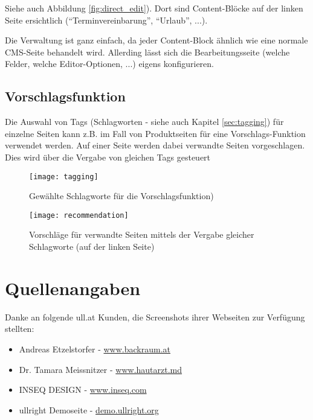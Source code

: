 \documentclass[article, a4paper, oneside, 11pt]{memoir}
\begin{document}
Siehe auch Abbildung \vref{fig:direct_edit}). Dort sind Content-Blöcke auf der linken Seite ersichtlich ("`Terminvereinbarung"', "`Urlaub"', ...).

Die Verwaltung ist ganz einfach, da jeder Content-Block ähnlich wie eine normale CMS-Seite behandelt wird.
Allerding lässt sich die Bearbeitungsseite (welche Felder, welche Editor-Optionen, ...) eigens konfigurieren.



\section{Vorschlagsfunktion}
\label{sec:recommendation}

Die Auswahl von Tags (Schlagworten - siehe auch Kapitel \vref{sec:tagging}) für einzelne Seiten kann z.B. im Fall von Produktseiten für eine Vorschlags-Funktion verwendet werden. Auf einer Seite werden dabei verwandte Seiten vorgeschlagen. Dies wird über die Vergabe von gleichen Tags gesteuert

\begin{figure}[htp]
\centering
\texttt{[image: tagging]}
\caption{Gewählte Schlagworte für die Vorschlagsfunktion)}
\label{fig:tagging2}
\end{figure}

\begin{figure}[htp]
\centering
\texttt{[image: recommendation]}
\caption{Vorschläge für verwandte Seiten mittels der Vergabe gleicher Schlagworte (auf der linken Seite)}
\label{fig:recommendation}
\end{figure}



\chapter{Quellenangaben}

Danke an folgende ull.at Kunden, die Screenshots ihrer Webseiten zur Verfügung stellten:

\begin{itemize}
\item Andreas Etzelstorfer - \href{http://www.backraum.at}{www.backraum.at}
\item Dr. Tamara Meissnitzer - \href{http://www.hautarzt.md}{www.hautarzt.md}
\item INSEQ DESIGN - \href{http://www.inseq.com}{www.inseq.com}
\item ullright Demoseite - \href{http://demo.ullright.org}{demo.ullright.org}
\end{itemize}
\end{document}
